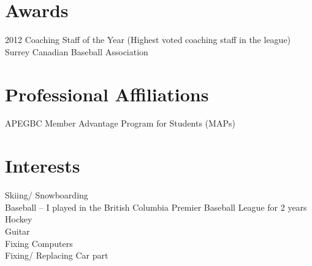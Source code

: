 \documentclass[]{friggeri-cv} %
\begin{document}

\section{Awards}

\begin{entrylist}
\entry
{2012}
{Coaching Staff of the Year (Highest voted coaching staff in the league)}
{}
{Surrey Canadian Baseball Association}
\end{entrylist}


\section{Professional Affiliations}
\begin{entrylist}
\entry
{}
{APEGBC Member Advantage Program for Students (MAPs)}
{}
{}
\end{entrylist}


\section{Interests}

Skiing/ Snowboarding \\
Baseball – I played in the British Columbia Premier Baseball League for 2 years \\
Hockey \\
Guitar \\
Fixing Computers \\
Fixing/ Replacing Car part \\

\newpage
\end{document}
